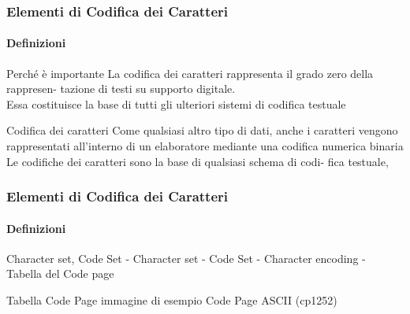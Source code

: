 \begin{frame}
    \frametitle{Elementi di Codifica dei Caratteri}
    \framesubtitle{Definizioni}
    \addtocounter{nframe}{1}
    
    \begin{block}{Perché è importante}
    La codifica dei caratteri rappresenta il grado zero della rappresen- tazione di testi su supporto digitale.
    \\ Essa costituisce la base di tutti gli ulteriori sistemi di codifica testuale
    \end{block}



    \begin{block}{Codifica dei caratteri}
        Come qualsiasi altro tipo di dati, anche i caratteri vengono rappresentati all’interno di un elaboratore mediante una codifica numerica binaria
        \\Le codifiche dei caratteri sono la base di qualsiasi schema di codi- fica testuale,
    \end{block}

\end{frame}

\begin{frame}
    \frametitle{Elementi di Codifica dei Caratteri}
    \framesubtitle{Definizioni}
    \addtocounter{nframe}{1}
    
    \begin{block}{Character set, Code Set}
     - Character set
     - Code Set
     - Character encoding
     - Tabella del Code page
    \end{block}

    \begin{block}{Tabella Code Page}
    immagine di esempio Code Page ASCII (cp1252)
    \end{block}

\end{frame}

